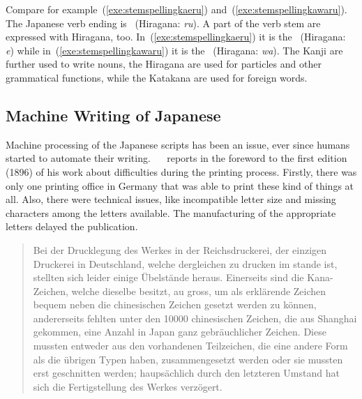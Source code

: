 Compare for example~(\ref{exe:stemspellingkaeru}) 
and~(\ref{exe:stemspellingkawaru}). 
The Japanese verb ending is 
~(Hiragana: \emph{ru}). A part of the verb stem are expressed with
Hiragana, too. In~(\ref{exe:stemspellingkaeru}) it is the 
~(Hiragana: \emph{e}) while in~(\ref{exe:stemspellingkawaru}) it is the 
~(Hiragana: \emph{wa}).
The Kanji are further used to write nouns, the Hiragana are used for particles 
and other grammatical functions, while the Katakana are used for foreign words.


\subsection{Machine Writing of Japanese}
\label{sec:machinewritingofjapanese}

Machine processing of the Japanese scripts has been an issue, ever since humans
started to automate their writing. 
~~\citeyear{Lange1922} reports in the foreword to the first edition (1896) of his work about difficulties during the printing process. 
Firstly, there was only one 
printing office in Germany that was able to print these kind of things at all.
Also, there were technical issues, like incompatible letter size and missing
characters among the letters available. The manufacturing of the appropriate
letters delayed the publication.
\begin{quote}
Bei der Drucklegung des Werkes in der Reichsdruckerei, der einzigen Druckerei 
in Deutschland, welche dergleichen zu drucken im stande ist, stellten sich 
leider einige Übelstände heraus. Einerseits sind die Kana-Zeichen, 
welche dieselbe besitzt, au gross, um als erklärende Zeichen bequem neben die 
chinesischen Zeichen gesetzt werden zu können, andererseits fehlten unter den 
10000 chinesischen Zeichen, die aus Shanghai gekommen, eine Anzahl in Japan 
ganz gebräuchlicher Zeichen. 
Diese mussten entweder aus den vorhandenen Teilzeichen,
die eine andere Form als die übrigen Typen haben, zusammengesetzt werden oder 
sie mussten erst geschnitten werden; 
haupsächlich durch den letzteren Umstand hat sich die Fertigstellung des Werkes 
verzögert.
\end{quote}

